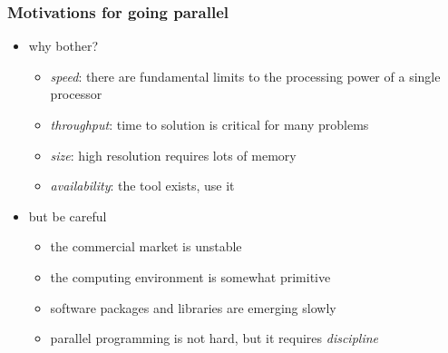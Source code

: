 %
%


\begin{frame}[fragile]
%
  \frametitle{Motivations for going parallel}
%
  \begin{itemize}
%
  \item why bother?
    \begin{itemize}
    \item {\em speed}: there are fundamental limits to the processing power of a single processor
    \item {\em throughput}: time to solution is critical for many problems
    \item {\em size}: high resolution requires lots of memory
    \item {\em availability}: the tool exists, use it
    \end{itemize}
%
  \item but be careful
    \begin{itemize}
    \item the commercial market is unstable
    \item the computing environment is somewhat primitive
    \item software packages and libraries are emerging slowly
    \item parallel programming is not hard, but it requires {\em discipline}
    \end{itemize}
%
  \end{itemize}
%
\end{frame}


